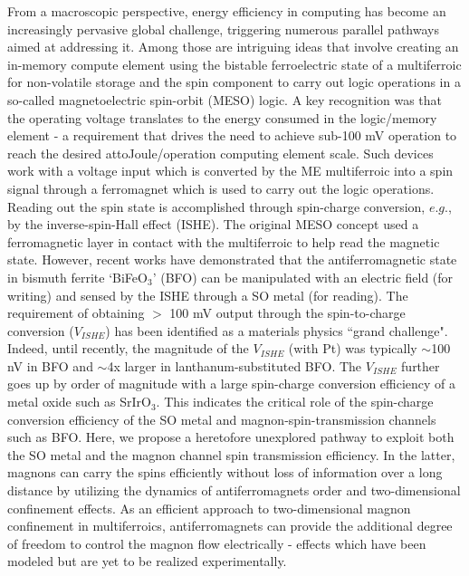 \documentclass[12pt]{article}
\begin{document}
From a macroscopic perspective, energy efficiency in computing has become an increasingly pervasive global challenge, triggering numerous parallel pathways aimed at addressing it\cite{AlbertRMP,salahuddin2018era}. Among those are intriguing ideas that involve creating an in-memory compute element using the bistable ferroelectric state of a multiferroic for non-volatile storage and the spin component to carry out logic operations in a so-called magnetoelectric spin-orbit (MESO) logic\cite{manipatruni2019scalable}. A key recognition was that the operating voltage translates to the energy consumed in the logic/memory element - a requirement that drives the need to achieve sub-100 mV operation to reach the desired attoJoule/operation computing element scale. %
Such devices work with a voltage input which is converted by the ME multiferroic into a spin signal through a ferromagnet which is used to carry out the logic operations. Reading out the spin state is accomplished through spin-charge conversion, $e.g.$, by the inverse-spin-Hall effect (ISHE)\cite{vaz2024voltage}. The original MESO concept\cite{manipatruni2019scalable} used a ferromagnetic layer in contact with the multiferroic to help read the magnetic state. However, recent works\cite{chai2024voltage,huang2024manipulating} have demonstrated that the antiferromagnetic state in bismuth ferrite `BiFeO$_3$' (BFO) can be manipulated with an electric field (for writing)\cite{cherifi2014electric,chu2008electric} and sensed by the ISHE through a SO metal (for reading)\cite{parsonnet2022nonvolatile}.
The requirement of obtaining $>$ 100 mV output through the spin-to-charge conversion ($V_{ISHE}$)
has been identified as a materials physics ``grand challenge". Indeed, until recently, the magnitude of the $V_{ISHE}$ (with Pt) was typically $\sim$100 nV in BFO\cite{parsonnet2022nonvolatile} and $\sim$4x larger in lanthanum-substituted BFO\cite{husain2024non}. The $V_{ISHE}$ further goes up by order of magnitude with a large spin-charge conversion efficiency of a metal oxide such as SrIrO$_3$\cite{huang2024manipulating}. This indicates the critical role of the spin-charge conversion efficiency of the SO metal and magnon-spin-transmission channels such as BFO. Here, we propose a heretofore unexplored pathway to exploit both the SO metal and the magnon channel spin transmission efficiency. In the latter, magnons can carry the spins efficiently without loss of information over a long distance by utilizing the dynamics of antiferromagnets order\cite{han2023coherent,lebrun2018tunable} and two-dimensional confinement effects\cite{wei2022giant}. As an efficient approach to two-dimensional magnon confinement in multiferroics, antiferromagnets can provide the additional degree of freedom to control the magnon flow electrically - effects which have been modeled\cite{beairsto2021confined} but are yet to be realized experimentally.
\end{document}
